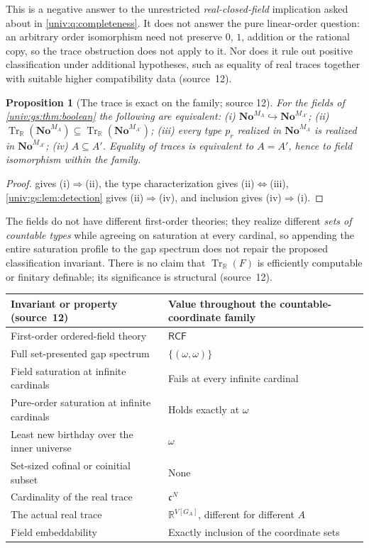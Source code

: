 \documentclass[11pt,letterpaper]{article}
\numberwithin{equation}{section}
\newtheorem{proposition}[proposition]{Proposition}
\theoremstyle{definition}
\theoremstyle{remark}
\newcommand{\No}{\mathbf{No}}
\newcommand{\R}{\mathbb R}
\newcommand{\RCF}{\mathsf{RCF}}
\newcommand{\Tr}{\operatorname{Tr}_{\R}}
\begin{document}
This is a negative answer to the unrestricted \emph{real-closed-field} implication asked about
in \cref{univ:q:completeness}. It does not answer the pure linear-order question: an arbitrary
order isomorphism need not preserve $0$, $1$, addition or the rational copy, so the trace
obstruction does not apply to it. Nor does it rule out positive classification under
additional hypotheses, such as equality of real traces together with suitable higher
compatibility data (source~12).

\begin{proposition}[The trace is exact on the family; source 12]\label{univ:gs:prop:traceexact}
For the fields of \cref{univ:gs:thm:boolean} the following are equivalent: (i)
$\No^{M_A}\hookrightarrow\No^{M_{A'}}$; (ii) $\Tr(\No^{M_A})\subseteq\Tr(\No^{M_{A'}})$; (iii) every
type $p_r$ realized in $\No^{M_A}$ is realized in $\No^{M_{A'}}$; (iv) $A\subseteq A'$. Equality
of traces is equivalent to $A=A'$, hence to field isomorphism within the family.
\end{proposition}
\begin{proof}
 gives (i)$\Rightarrow$(ii), the type characterization gives
(ii)$\Leftrightarrow$(iii), \cref{univ:gs:lem:detection} gives (ii)$\Rightarrow$(iv), and
inclusion gives (iv)$\Rightarrow$(i).
\end{proof}

The fields do not have different first-order theories; they realize different \emph{sets of
countable types} while agreeing on saturation at every cardinal, so appending the entire
saturation profile to the gap spectrum does not repair the proposed classification invariant.
There is no claim that $\Tr(F)$ is efficiently computable or finitary definable; its
significance is structural (source~12).

\begin{center}\small
\begin{tabular}{@{}P{0.44\textwidth}P{0.46\textwidth}@{}}
\toprule
Invariant or property (source~12) & Value throughout the countable-coordinate family\\
\midrule
First-order ordered-field theory & $\RCF$\\
Full set-presented gap spectrum & $\{(\omega,\omega)\}$\\
Field saturation at infinite cardinals & Fails at every infinite cardinal\\
Pure-order saturation at infinite cardinals & Holds exactly at $\omega$\\
Least new birthday over the inner universe & $\omega$\\
Set-sized cofinal or coinitial subset & None\\
Cardinality of the real trace & $\mathfrak c^N$\\
The actual real trace & $\R^{V[G_A]}$, different for different $A$\\
Field embeddability & Exactly inclusion of the coordinate sets\\
\bottomrule
\end{tabular}
\end{center}
\end{document}
